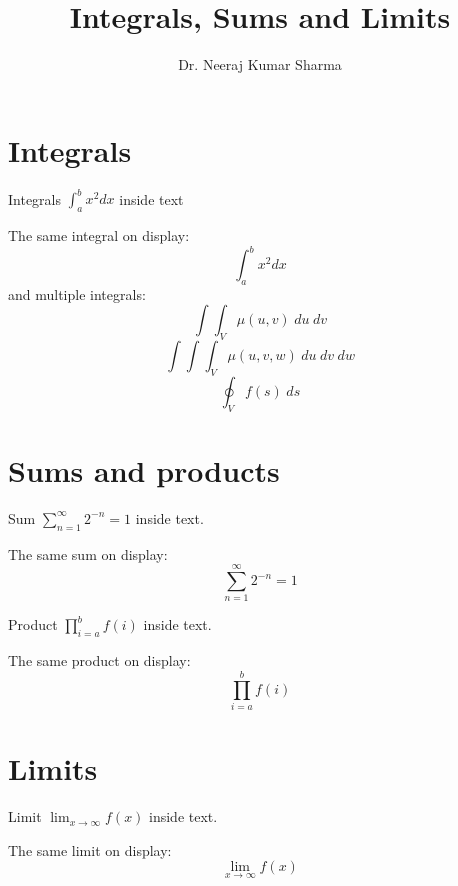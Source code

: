 \documentclass[11pt,a4paper]{article}
\title{Integrals, Sums and Limits}
\author{Dr. Neeraj Kumar Sharma}
\date{}
\begin{document}
\maketitle
\section{Integrals}
Integrals $\int_{a}^{b}x^2 dx$ inside text

The same integral on display:$$\int_{a}^{b} x^2 dx$$ and multiple integrals:
$$
\int\int_{V}\mu(u,v)\hspace{3pt}du\hspace{3pt}dv
$$
$$
\int\int\int_{V}\mu(u,v,w)\hspace{3pt}du\hspace{3pt}dv\hspace{3pt}dw
$$
$$
\oint_{V} f(s)\hspace{3pt}ds
$$
\section{Sums and products}
Sum $ \sum_{n=1}^{\infty} 2^{-n} = 1$ inside text.

The same sum on display:
$$
\sum_{n=1}^{\infty}2^{-n} = 1
$$

Product $\prod_{i=a}^{b}f(i)$ inside text.

The same product on display:
$$\prod_{i=a}^{b}f(i)$$

\section{Limits}
Limit $\lim_{x\to\infty}f(x)$ inside text.

The same limit on display:
$$\lim_{x\to\infty}f(x)$$
\end{document}
